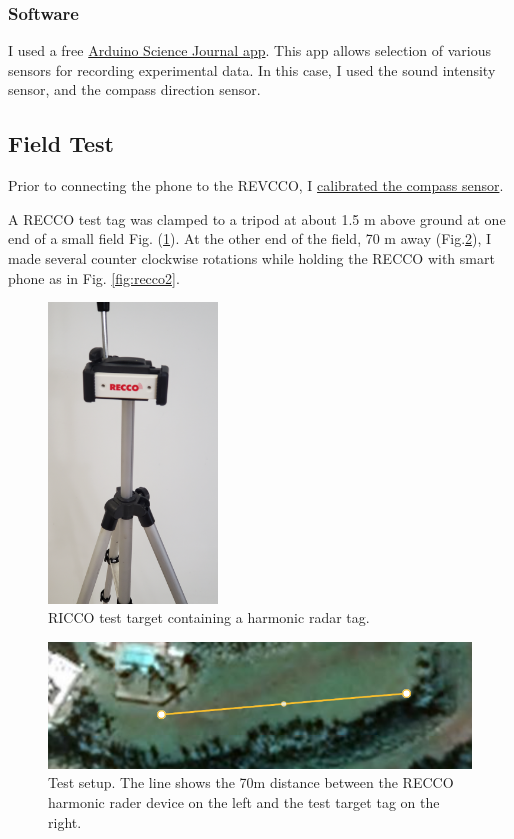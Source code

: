 \documentclass[12pt,letterpaper,english,bibliography=totocnumbered, abstract=on]{scrartcl}
\begin{document}
\subsubsection{Software}

I used a free \href{https://www.arduino.cc/education/science-journal}{Arduino Science Journal app}. This app allows selection of various sensors for recording experimental data.  In this case, I used the sound intensity sensor, and the compass direction sensor.

\subsection{Field Test}

Prior to connecting the phone to the REVCCO, I \href{https://www.howtogeek.com/519142/how-to-calibrate-the-compass-on-android-to-improve-device-location-accuracy/}{calibrated the compass sensor}.

A RECCO test tag was clamped to a tripod at about 1.5 m above ground at one end of a small field Fig. (\ref{fig:target}). At the other end of the field, 70 m away (Fig.\ref{fig:screenshot-from-2021-02-22-08-47-24}), I made several counter clockwise rotations while holding the RECCO with smart phone as in Fig. \ref{fig:recco2}.

\begin{figure}[p]
	\centering
	\includegraphics[width=0.4\textwidth, angle=-90]{"images/target"}
	\caption{RICCO test target containing a harmonic radar tag.}
	\label{fig:target}
\end{figure}

\begin{figure}[p]
	\centering
	\includegraphics[width=0.7\linewidth]{"images/Screenshot from 2021-02-22 08-47-24"}
	\caption{Test setup. The line shows the 70m distance between the RECCO harmonic rader device on the left and the test target tag on the right.}
	\label{fig:screenshot-from-2021-02-22-08-47-24}
\end{figure}
\end{document}
